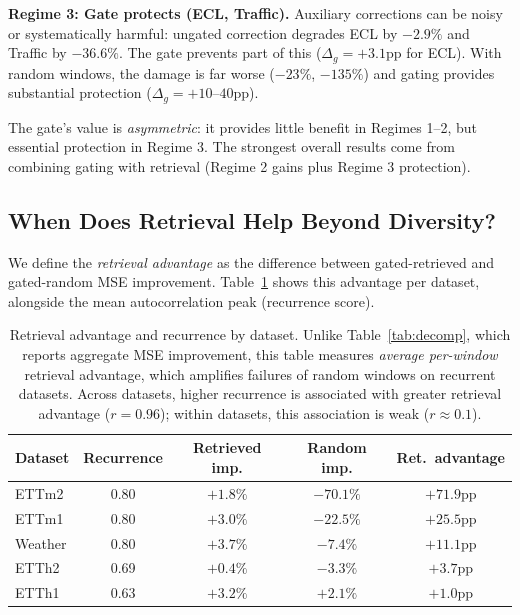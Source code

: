 \documentclass{article}
\begin{document}
\textbf{Regime 3: Gate protects (ECL, Traffic).} Auxiliary corrections can be noisy or systematically harmful: ungated correction degrades ECL by $-2.9\%$ and Traffic by $-36.6\%$. The gate prevents part of this ($\Delta_g = +3.1$pp for ECL). With random windows, the damage is far worse ($-23\%$, $-135\%$) and gating provides substantial protection ($\Delta_g = +10$--$40$pp).

The gate's value is \emph{asymmetric}: it provides little benefit in Regimes 1--2, but essential protection in Regime 3. The strongest overall results come from combining gating with retrieval (Regime 2 gains plus Regime 3 protection).

\subsection{When Does Retrieval Help Beyond Diversity?}
\label{sec:recurrence}

We define the \emph{retrieval advantage} as the difference between gated-retrieved and gated-random MSE improvement. Table~\ref{tab:recurrence} shows this advantage per dataset, alongside the mean autocorrelation peak (recurrence score).

\begin{table}[h]
\centering
\caption{Retrieval advantage and recurrence by dataset. Unlike Table~\ref{tab:decomp}, which reports aggregate MSE improvement, this table measures \emph{average per-window} retrieval advantage, which amplifies failures of random windows on recurrent datasets. Across datasets, higher recurrence is associated with greater retrieval advantage ($r{=}0.96$); within datasets, this association is weak ($r{\approx}0.1$).}
\label{tab:recurrence}
\small
\begin{tabular}{l c c c c}
\toprule
Dataset & Recurrence & Retrieved imp. & Random imp. & Ret.\ advantage \\
\midrule
ETTm2 & 0.80 & $+1.8\%$ & $-70.1\%$ & $+71.9$pp \\
ETTm1 & 0.80 & $+3.0\%$ & $-22.5\%$ & $+25.5$pp \\
Weather & 0.80 & $+3.7\%$ & $-7.4\%$ & $+11.1$pp \\
ETTh2 & 0.69 & $+0.4\%$ & $-3.3\%$ & $+3.7$pp \\
ETTh1 & 0.63 & $+3.2\%$ & $+2.1\%$ & $+1.0$pp \\
\bottomrule
\end{tabular}
\end{table}
\end{document}
